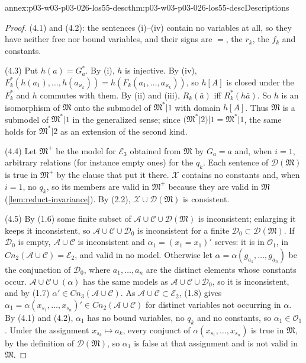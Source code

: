 \begin{annexitem}{annex:p03-w03-p03-026-los55-desc}{thm:p03-w03-p03-026-los55-desc}{Descriptions}
\begin{proof}
(4.1) and (4.2): the sentences (i)--(iv) contain no variables at all, so they
have neither free nor bound variables, and their signs are \(=\), the
\(r_k\), the \(f_k\) and constants.

(4.3) Put \(h(a)=G^*_a\).  By (i), \(h\) is injective.  By (iv),
\(F^*_k(h(a_1),\ldots,h(a_{\varkappa_k}))=h(F_k(a_1,\ldots,a_{\varkappa_k}))\),
so \(h[A]\) is closed under the \(F^*_k\) and \(h\) commutes with them.  By
(ii) and (iii), \(R_k(\bar a)\) iff \(R^*_k(h\bar a)\).  So \(h\) is an
isomorphism of \(\mathfrak M\) onto the submodel of \(\mathfrak M^*|1\) with
domain \(h[A]\).  Thus \(\mathfrak M\) is a submodel of \(\mathfrak M^*|1\) in
the generalized sense; since \((\mathfrak M^*|2)|1=\mathfrak M^*|1\), the same
holds for \(\mathfrak M^*|2\) as an extension of the second kind.

(4.4) Let \(\mathfrak M^+\) be the model for \(\mathcal E_3\) obtained from
\(\mathfrak M\) by \(G_a=a\) and, when \(i=1\), arbitrary relations (for
instance empty ones) for the \(q_k\).  Each sentence of
\(\mathcal D(\mathfrak M)\) is true in \(\mathfrak M^+\) by the clause that put
it there.  \(\mathcal X\) contains no constants and, when \(i=1\), no
\(q_k\), so its members are valid in \(\mathfrak M^+\) because they are valid
in \(\mathfrak M\) (\cref{lem:reduct-invariance}).  By (2.2),
\(\mathcal X\cup\mathcal D(\mathfrak M)\) is consistent.

(4.5) By (1.6) some finite subset of
\(\mathcal A\cup\mathcal C\cup\mathcal D(\mathfrak M)\) is inconsistent;
enlarging it keeps it inconsistent, so
\(\mathcal A\cup\mathcal C\cup\mathcal D_0\) is inconsistent for a finite
\(\mathcal D_0\subset\mathcal D(\mathfrak M)\).  If \(\mathcal D_0\) is empty,
\(\mathcal A\cup\mathcal C\) is inconsistent and \(\alpha_1=(x_1=x_1)'\)
serves: it is in \(\mathcal O_1\), in
\(\mathit{Cn}_2(\mathcal A\cup\mathcal C)=\mathcal E_2\), and valid in no model.
Otherwise let \(\alpha=\alpha(g_{a_1},\ldots,g_{a_n})\) be the conjunction of
\(\mathcal D_0\), where \(a_1,\ldots,a_n\) are the distinct elements whose
constants occur.  \(\mathcal A\cup\mathcal C\cup(\alpha)\) has the same models
as \(\mathcal A\cup\mathcal C\cup\mathcal D_0\), so it is inconsistent, and by
(1.7) \(\alpha'\in\mathit{Cn}_3(\mathcal A\cup\mathcal C)\).  As
\(\mathcal A\cup\mathcal C\subset\mathcal E_2\), (1.8) gives
\(\alpha_1=\alpha(x_{s_1},\ldots,x_{s_n})'\in\mathit{Cn}_2(\mathcal A\cup\mathcal C)\)
for distinct variables not occurring in \(\alpha\).  By (4.1) and (4.2),
\(\alpha_1\) has no bound variables, no \(q_k\) and no constants, so
\(\alpha_1\in\mathcal O_1\).  Under the assignment \(x_{s_k}\mapsto a_k\),
every conjunct of \(\alpha(x_{s_1},\ldots,x_{s_n})\) is true in \(\mathfrak M\),
by the definition of \(\mathcal D(\mathfrak M)\), so \(\alpha_1\) is false at
that assignment and is not valid in \(\mathfrak M\).
\end{proof}
\end{annexitem}

